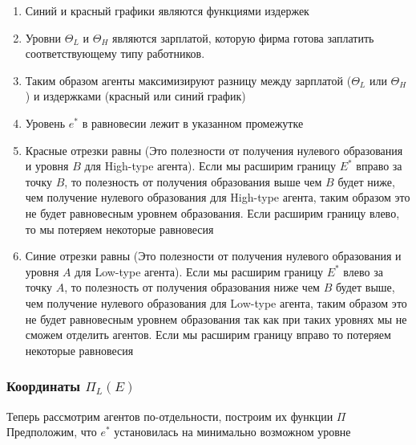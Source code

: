 \begin{enumerate}
    \item Синий и красный графики являются функциями издержек
    \item Уровни $\Theta_L$ и $\Theta_H$ являются зарплатой, которую фирма готова заплатить соответствующему типу работников.
    \item Таким образом агенты максимизируют разницу между зарплатой ($\Theta_L$ или $\Theta_H$) и издержками (красный или синий график)
    \item Уровень $e^*$ в равновесии лежит в указанном промежутке
    \item Красные отрезки равны (Это полезности от получения нулевого образования и уровня $B$ для High-type агента).
    Если мы расширим границу $E^*$ вправо за точку $B$, то полезность от получения образования выше чем $B$ будет ниже, чем получение
    нулевого образования для High-type агента, таким образом это не будет равновесным уровнем образования. Если расширим границу влево,
    то мы потеряем некоторые равновесия
    \item Синие отрезки равны (Это полезности от получения нулевого образования и уровня $A$ для Low-type агента). Если
    мы расширим границу $E^*$ влево за точку $A$, то полезность от получения образования ниже чем $B$ будет выше, чем
    получение нулевого образования для Low-type агента, таким образом это не будет равновесным уровнем образования так
    как при таких уровнях мы не сможем отделить агентов. Если мы расширим границу вправо то потеряем некоторые
    равновесия
\end{enumerate}

\subsubsection{Координаты $\Pi_L(E)$}

\indent\setlength{\parindent}{1em}Теперь рассмотрим агентов по-отдельности, построим их функции $\Pi$\\

\indent\setlength{\parindent}{1em}Предположим, что $e^*$ установилась на минимально возможном уровне

